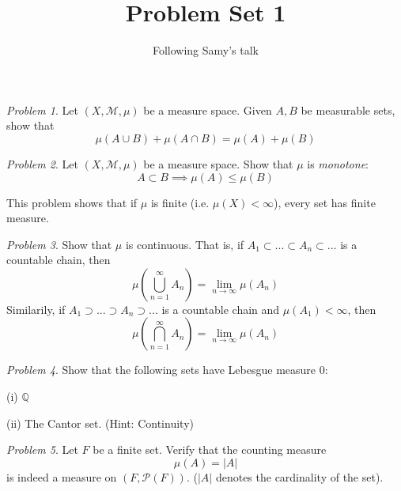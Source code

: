 \documentclass[11pt]{article}
\title{Problem Set 1}
\author{Following Samy's talk}
\date{}
\theoremstyle{definition}
\theoremstyle{example}
\theoremstyle{remark}
\theoremstyle{lemma}
\theoremstyle{proposition}
\theoremstyle{Problem}
\newtheorem{problem}{Problem}[section]
\theoremstyle{Solution}
\theoremstyle{theorem}
\theoremstyle{corollary}
\begin{document}
\maketitle
\begin{problem}
Let $(X,\mathcal{M},\mu)$ be a measure space. Given $A,B$ be measurable sets, show that $$\mu(A\cup B) + \mu(A\cap B)= \mu(A)+\mu(B)$$
\end{problem}

\begin{problem}
Let $(X,\mathcal{M},\mu)$ be a measure space. Show that $\mu$ is \emph{monotone}:
$$A\subset B \implies \mu(A) \leq \mu(B)$$
\end{problem}
This problem shows that if $\mu$ is finite (i.e. $\mu(X) <\infty$), every set has finite measure.

\begin{problem}
Show that $\mu$ is continuous. That is, if $A_1\subset ... \subset A_n \subset ...$ is a countable chain, then $$\mu\left(\bigcup_{n=1}^{\infty} A_n\right) = \lim_{n\to \infty} \mu(A_n)$$
Similarily, if $A_1 \supset  ... \supset A_n \supset ...$ is a countable chain and $\mu(A_1)<\infty$, then
$$\mu\left(\bigcap_{n=1}^{\infty} A_n\right) = \lim_{n\to \infty} \mu(A_n)$$
\end{problem}

\begin{problem}
Show that the following sets have Lebesgue measure $0$:

(i) $\mathbb{Q}$ 

(ii) The Cantor set. (Hint: Continuity)

\end{problem}

\begin{problem}
Let $F$ be a finite set. Verify that the counting measure 
$$\mu(A) = |A|$$
is indeed a measure on $(F, \mathcal{P}(F))$. ($|A|$ denotes the cardinality of the set).
\end{problem}
\end{document}

